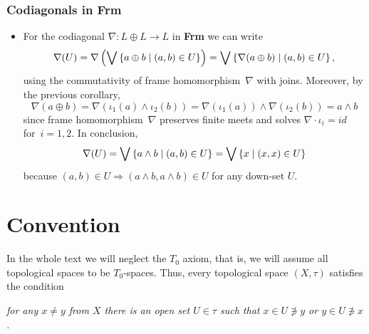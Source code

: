 \subsubsection*{Codiagonals in Frm}

\begin{itemize}
\item \label{codiag-in-Frm}
For the codiagonal $\nabla\colon L \oplus L \to L$ in {\bf Frm} we can write
\[
  \nabla(U)
   = \nabla \left( \bigvee \left\{ a \oplus b \mid (a, b)\in U \right\}
       \right)
   = \bigvee \left\{ \nabla(a \oplus b) \mid (a, b)\in U \right\},
\]
using the commutativity of frame homomorphism~$\nabla$ with joins.
Moreover, by the previous corollary,
\[
  \nabla(a \oplus b)
  = \nabla( \iota_1(a) \wedge \iota_2(b) )
  = \nabla(\iota_1(a)) \wedge \nabla(\iota_2(b))
  = a \wedge b
\]
since frame homomorphism~$\nabla$ preserves finite meets and solves
$\nabla\cdot \iota_i = id$ for~$i = 1, 2$.
In conclusion,
\[
  \nabla(U)
   = \bigvee \left\{ a \wedge b \mid (a, b)\in U \right\}
   = \bigvee \left\{ x \mid (x, x)\in U \right\}
\]
because $(a, b)\in U \Rightarrow (a \wedge b, a \wedge b)\in U$ for any
down-set $U$.
\end{itemize}

\section*{Convention}

In the whole text we will neglect the $T_0$ axiom, that is, we will assume all
topological spaces to be $T_0$-spaces.
Thus, every topological space $(X, \tau)$ satisfies the condition
\begin{center} \it
  for any $x \ne y$ from $X$ there is an open set $U \in \tau$ such that $x \in U
  \not\owns y$ or $y \in U \not\owns x$.
\end{center}
